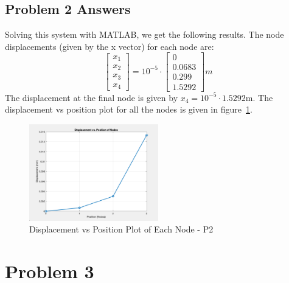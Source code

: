 \documentclass[8pt]{article}
\begin{document}
\subsection{Problem 2 Answers}
Solving this system with MATLAB, we get the following results. The node displacements (given by the x vector) for each node are:
\[
\begin{bmatrix}
    x_1 \\
    x_2 \\
    x_3 \\
    x_4 
\end{bmatrix}
=
10^{-5} \cdot
\begin{bmatrix}
    0 \\
    0.0683 \\
    0.299 \\
    1.5292 
\end{bmatrix}
m
\]
The displacement at the final node is given by \(x_4 = 10^{-5}\cdot1.5292\)m.
The displacement vs position plot for all the nodes is given in figure~\ref{fig:P2_out}.
\begin{figure}[h!]
    \centering
    \includegraphics[width=0.5\textwidth]{../../assets/Q2_Graph}
    \caption{Displacement vs Position Plot of Each Node - P2}
    \label{fig:P2_out}
\end{figure}



\section{Problem 3}
\end{document}
